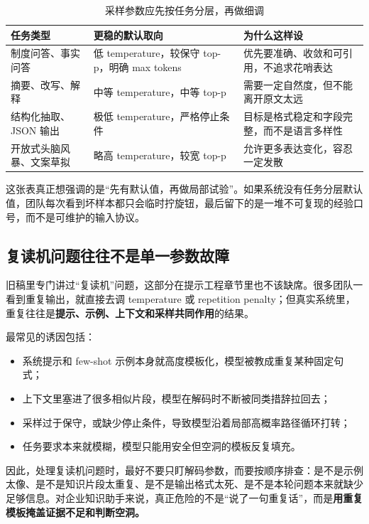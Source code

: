 \begin{table}[H]
\centering
\small
\begin{tabularx}{\textwidth}{>{\raggedright\arraybackslash}p{3cm}>{\raggedright\arraybackslash}p{4cm}>{\raggedright\arraybackslash}X}
\toprule
\textbf{任务类型} & \textbf{更稳的默认取向} & \textbf{为什么这样设} \\
\midrule
制度问答、事实问答 & 低 temperature，较保守 top-p，明确 max tokens & 优先要准确、收敛和可引用，不追求花哨表达 \\
摘要、改写、解释 & 中等 temperature，中等 top-p & 需要一定自然度，但不能离开原文太远 \\
结构化抽取、JSON 输出 & 极低 temperature，严格停止条件 & 目标是格式稳定和字段完整，而不是语言多样性 \\
开放式头脑风暴、文案草拟 & 略高 temperature，较宽 top-p & 允许更多表达变化，容忍一定发散 \\
\bottomrule
\end{tabularx}
\caption{采样参数应先按任务分层，再做细调}
\label{tab:task-wise-sampling-defaults}
\end{table}

这张表真正想强调的是“先有默认值，再做局部试验”。如果系统没有任务分层默认值，团队每次看到坏样本都只会临时拧旋钮，最后留下的是一堆不可复现的经验口号，而不是可维护的输入协议。

\subsection{复读机问题往往不是单一参数故障}
旧稿里专门讲过“复读机”问题，这部分在提示工程章节里也不该缺席。很多团队一看到重复输出，就直接去调 temperature 或 repetition penalty；但真实系统里，重复往往是\textbf{提示、示例、上下文和采样共同作用}的结果。

最常见的诱因包括：
\begin{itemize}
  \item 系统提示和 few-shot 示例本身就高度模板化，模型被教成重复某种固定句式；
  \item 上下文里塞进了很多相似片段，模型在解码时不断被同类措辞拉回去；
  \item 采样过于保守，或缺少停止条件，导致模型沿着局部高概率路径循环打转；
  \item 任务要求本来就模糊，模型只能用安全但空洞的模板反复填充。
\end{itemize}

因此，处理复读机问题时，最好不要只盯解码参数，而要按顺序排查：是不是示例太像、是不是知识片段太重复、是不是输出格式太死、是不是本轮问题本来就缺少足够信息。对企业知识助手来说，真正危险的不是“说了一句重复话”，而是\textbf{用重复模板掩盖证据不足和判断空洞。}

